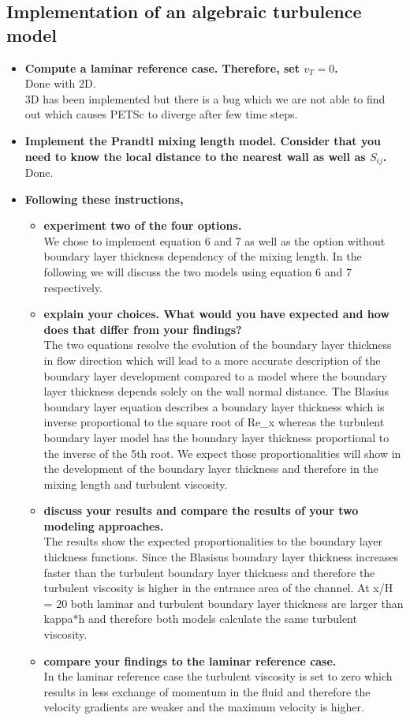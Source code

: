 \documentclass[a4paper]{article}
\begin{document}
\subsection{Implementation of an algebraic turbulence model}
\begin{itemize}
	\item \textbf{Compute a laminar reference case. Therefore, set $v_T = 0$.}\\
	Done with 2D.\\
	3D has been implemented but there is a bug which we are not able to find out which causes PETSc to diverge after few time steps.
	\item \textbf{Implement the Prandtl mixing length model. Consider that you need to know the local distance to the nearest wall as well as $S_{ij}$.}\\
	Done.
	\item \textbf{Following these instructions,}
	\begin{itemize}
		\item \textbf{experiment two of the four options.}\\
		We chose to implement equation 6 and 7 as well as the option without boundary layer thickness dependency of the mixing length. In the following we will discuss the two models using equation 6 and 7 respectively. 
		\item \textbf{explain your choices. What would you have expected and how does that differ from your findings?}\\
The two equations resolve the evolution of the boundary layer thickness in flow direction which will lead to a more accurate description of the boundary layer development compared to a model where the boundary layer thickness depends solely on the wall normal distance. 
The Blasius boundary layer equation describes a boundary layer thickness which is inverse proportional to the square root of Re\_x whereas the turbulent boundary layer model has the boundary layer thickness proportional to the inverse of the 5th root. We expect those proportionalities will show in the development of the boundary layer thickness and therefore in the mixing length and turbulent viscosity. 
		\item \textbf{discuss your results and compare the results of your two modeling approaches.}\\
The results show the expected proportionalities to the boundary layer thickness functions. Since the Blasisus boundary layer thickness increases faster than the turbulent boundary layer thickness and therefore the turbulent viscosity is higher in the entrance area of the channel. At x/H = 20 both laminar and turbulent boundary layer thickness are larger than kappa*h and therefore both models calculate the same turbulent viscosity. 
		\item \textbf{compare your findings to the laminar reference case.}\\
In the laminar reference case the turbulent viscosity is set to zero which results in less exchange of momentum in the fluid and therefore the velocity gradients are weaker and the maximum velocity is higher.
	\end{itemize}
\end{itemize}
\end{document}
